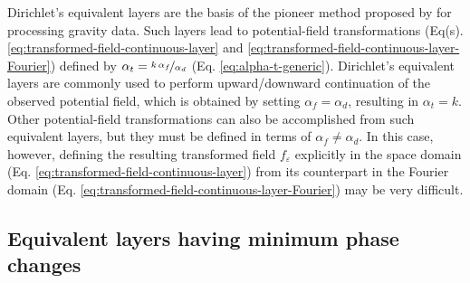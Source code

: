 Dirichlet's equivalent layers are the basis of the pioneer method proposed by \cite{dampney1969} for processing gravity data.
Such layers lead to potential-field transformations (Eq(s). 
\ref{eq:transformed-field-continuous-layer} and \ref{eq:transformed-field-continuous-layer-Fourier}) defined by 
$\alpha_{t} = \nicefrac{k \, \alpha_{f}}{\alpha_{d}}$ (Eq. \ref{eq:alpha-t-generic}).
Dirichlet's equivalent layers are commonly used to perform upward/downward continuation of the observed potential 
field, which is obtained by setting $\alpha_{f} = \alpha_{d}$, resulting in $\alpha_{t} = k$. 
Other potential-field transformations can also be accomplished from such equivalent layers, but they must be 
defined in terms of $\alpha_{f} \ne \alpha_{d}$.
In this case, however, defining the resulting transformed field $f_{\varepsilon}$ explicitly in the space domain 
(Eq. \ref{eq:transformed-field-continuous-layer}) 
from its counterpart in the Fourier domain (Eq. \ref{eq:transformed-field-continuous-layer-Fourier}) may be very difficult.


\subsection{Equivalent layers having minimum phase changes}


